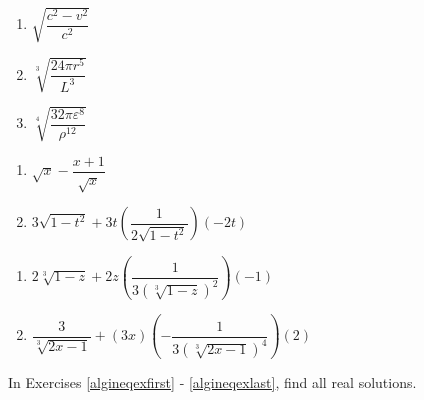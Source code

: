\documentclass[11pt]{article}
\theoremstyle{definition}  %
\newcounter{HW}
\begin{document}
\begin{multicols}{3}
\begin{enumerate}
\setcounter{enumi}{\value{HW}}

\item  $\sqrt{\dfrac{c^2 - v^2}{c^2}}$

\item  $\sqrt[3]{\dfrac{24 \pi r^5}{L^3}}$

\item   $\sqrt[4]{\dfrac{32 \pi \varepsilon^8}{\rho^{12}}}$    

\setcounter{HW}{\value{enumi}}
\end{enumerate}
\end{multicols}

\begin{multicols}{2}
\begin{enumerate}
\setcounter{enumi}{\value{HW}}

\item  $\sqrt{x} - \dfrac{x+1}{\sqrt{x}}$

\item  $3 \sqrt{1-t^2} + 3t\left(\dfrac{1}{2 \sqrt{1-t^2}}\right)(-2t)$

\setcounter{HW}{\value{enumi}}
\end{enumerate}
\end{multicols}

\begin{multicols}{2}
\begin{enumerate}
\setcounter{enumi}{\value{HW}}

\item  $2 \sqrt[3]{1-z} + 2z \left(\dfrac{1}{3 \left(\sqrt[3]{1-z}\right)^2}\right)(-1)$


\item  $\dfrac{3}{\sqrt[3]{2x-1}} + (3x)\left(-\dfrac{1}{3 \left(\sqrt[3]{2x-1} \right)^4}\right)(2)$  \label{simpradlast}

\setcounter{HW}{\value{enumi}}
\end{enumerate}
\end{multicols}



In Exercises \ref{algineqexfirst} - \ref{algineqexlast}, find all real solutions.
\end{document}
